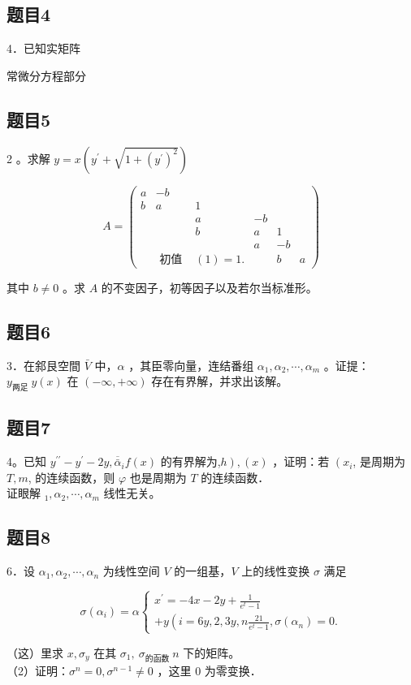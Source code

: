 \documentclass{article}
\begin{document}
\subsection{题目4}
4．已知实矩阵

常微分方程部分\\

\subsection{题目5}
2 。求解 \(y=x\left(y^{\prime}+\sqrt{1+\left(y^{\prime}\right)^{2}}\right)\)

\[
A=\left(\begin{array}{cccccc}
a & -b & & & & \\
b & a & 1 & & & \\
& & a & -b & & \\
& & b & a & 1 & \\
& & & a & -b \\
& \text { 初值 } & (1)=1 . & & b & a
\end{array}\right)
\]

其中 \(b \neq 0\) 。求 \(A\) 的不变因子，初等因子以及若尔当标准形。\\

\subsection{题目6}
3．在䣄艮空間 \(\bar{V}\) 中，\(\alpha\) ，其臣零向量，连结番组 \(\alpha_{1}, \alpha_{2}, \cdots, \alpha_{m}\) 。证提：\(y_{\text {两足 }} y(x)\) 在 \((-\infty,+\infty)\) 存在有界解，并求出该解。\\

\subsection{题目7}
4。已知 \(y^{\prime \prime}-y^{\prime}-2 y, \overline{\bar{\alpha}}_{i} f(x)\) 的有界解为,\(\left.h\right),(x)\) ，证明：若 \(\left(x_{i}\right.\), 是周期为 \(T, m\), 的连续函数，则 \(\varphi\) 也是周期为 \(T\) 的连续函数．\\
证眼解 \({ }_{1}, \alpha_{2}, \cdots, \alpha_{m}\) 线性无关。\\

\subsection{题目8}
6．设 \(\alpha_{1}, \alpha_{2}, \cdots, \alpha_{n}\) 为线性空间 \(V\) 的一组基，\(V\) 上的线性变换 \(\sigma\) 满足

\[
\sigma\left(\alpha_{i}\right)=\alpha\left\{\begin{array}{c}
x^{\prime}=-4 x-2 y+\frac{1}{e^{t}-1} \\
+y\left(i=6 y, 2,3 y, n \frac{21}{e^{t}-1}, \sigma\left(\alpha_{n}\right)=0 .\right.
\end{array}\right.
\]

（这）里求 \(x, \sigma_{y}\) 在其 \(\sigma_{1}, ~ \sigma_{\text {的函数 }} n\) 下的矩阵。\\
（2）证明：\(\sigma^{n}=0, \sigma^{n-1} \neq 0\) ，这里 0 为零变换．
\end{document}
